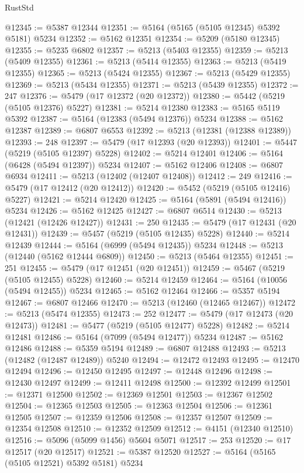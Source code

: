 \begin{lexlean}{RustStd}
\begin{coremodule}
@12345 := @5387 @12344
@12351 := @5164 (@5165 (@5105 @12345) @5392 @5181) @5234
@12352 := @5162 @12351
@12354 := @5209 (@5180 @12345)
@12355 := @5235 @6802
@12357 := @5213 (@5403 @12355)
@12359 := @5213 (@5409 @12355)
@12361 := @5213 (@5414 @12355)
@12363 := @5213 (@5419 @12355)
@12365 := @5213 (@5424 @12355)
@12367 := @5213 (@5429 @12355)
@12369 := @5213 (@5434 @12355)
@12371 := @5213 (@5439 @12355)
@12372 := 247
@12376 := @5479 (@17 @12372 (@20 @12372))
@12380 := @5442 (@5219 (@5105 @12376) @5227)
@12381 := @5214 @12380
@12383 := @5165 @5119 @5392
@12387 := @5164 (@12383 (@5494 @12376)) @5234
@12388 := @5162 @12387
@12389 := @6807 @6553
@12392 := @5213 (@12381 (@12388 @12389))
@12393 := 248
@12397 := @5479 (@17 @12393 (@20 @12393))
@12401 := @5447 (@5219 (@5105 @12397) @5228)
@12402 := @5214 @12401
@12406 := @5164 (@6428 (@5494 @12397)) @5234
@12407 := @5162 @12406
@12408 := @6807 @6934
@12411 := @5213 (@12402 (@12407 @12408))
@12412 := 249
@12416 := @5479 (@17 @12412 (@20 @12412))
@12420 := @5452 (@5219 (@5105 @12416) @5227)
@12421 := @5214 @12420
@12425 := @5164 (@5891 (@5494 @12416)) @5234
@12426 := @5162 @12425
@12427 := @6807 @6514
@12430 := @5213 (@12421 (@12426 @12427))
@12431 := 250
@12435 := @5479 (@17 @12431 (@20 @12431))
@12439 := @5457 (@5219 (@5105 @12435) @5228)
@12440 := @5214 @12439
@12444 := @5164 (@6999 (@5494 @12435)) @5234
@12448 := @5213 (@12440 (@5162 @12444 @6809))
@12450 := @5213 (@5464 @12355)
@12451 := 251
@12455 := @5479 (@17 @12451 (@20 @12451))
@12459 := @5467 (@5219 (@5105 @12455) @5228)
@12460 := @5214 @12459
@12464 := @5164 (@10056 (@5494 @12455)) @5234
@12465 := @5162 @12464
@12466 := @5357 @5194
@12467 := @6807 @12466
@12470 := @5213 (@12460 (@12465 @12467))
@12472 := @5213 (@5474 @12355)
@12473 := 252
@12477 := @5479 (@17 @12473 (@20 @12473))
@12481 := @5477 (@5219 (@5105 @12477) @5228)
@12482 := @5214 @12481
@12486 := @5164 (@7099 (@5494 @12477)) @5234
@12487 := @5162 @12486
@12488 := @5359 @5194
@12489 := @6807 @12488
@12493 := @5213 (@12482 (@12487 @12489)) @5240
@12494 := @12472 @12493
@12495 := @12470 @12494
@12496 := @12450 @12495
@12497 := @12448 @12496
@12498 := @12430 @12497
@12499 := @12411 @12498
@12500 := @12392 @12499
@12501 := @12371 @12500
@12502 := @12369 @12501
@12503 := @12367 @12502
@12504 := @12365 @12503
@12505 := @12363 @12504
@12506 := @12361 @12505
@12507 := @12359 @12506
@12508 := @12357 @12507
@12509 := @12354 @12508
@12510 := @12352 @12509
@12512 := @4151 (@12340 @12510)
@12516 := @5096 (@5099 @1456) @5604 @5071
@12517 := 253
@12520 := @17 @12517 (@20 @12517)
@12521 := @5387 @12520
@12527 := @5164 (@5165 (@5105 @12521) @5392 @5181) @5234

\end{coremodule}
\end{lexlean}
